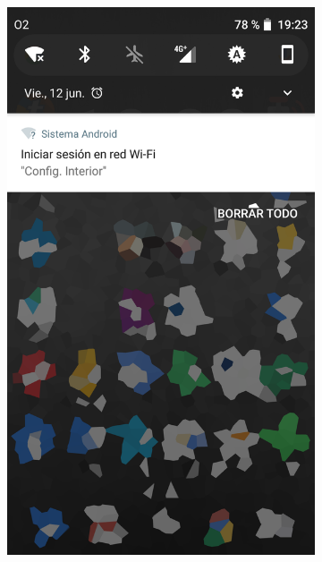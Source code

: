 \begin{figure}
\begin{subfigure}{0.49\columnwidth}
  \centering
  \includegraphics[width=1\columnwidth,frame]{images/interior-captive-portal-notification}
  \caption{}
  \label{fig:interior-captive-portal-notification}
\end{subfigure}
\hfill
\begin{subfigure}{0.49\columnwidth}
  \centering

\end{subfigure}
\end{figure}

